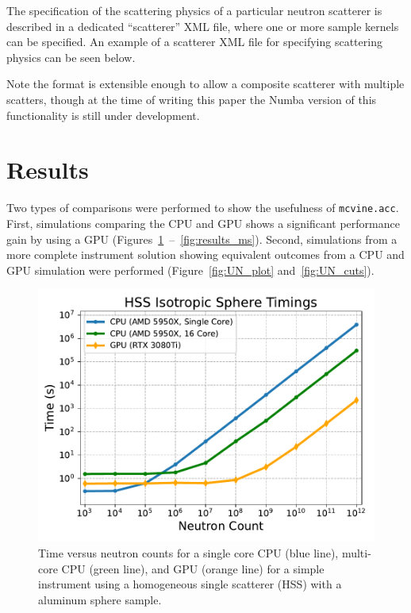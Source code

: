 The specification of the scattering physics of a particular neutron scatterer is described in a dedicated ``scatterer'' XML file, where one or more sample kernels can be specified.
An example of a scatterer XML file for specifying scattering physics can be seen below.

\vspace{1mm}

\vspace{1mm}

Note the format is extensible enough to allow a composite scatterer with multiple scatters, though at the time of writing this paper the Numba version of this functionality is still under development.


\section{Results}

Two types of comparisons were performed to show the usefulness of \texttt{mcvine.acc}. First, simulations comparing the CPU and GPU shows a significant performance gain by using a GPU (Figures~\hbox{\ref{fig:results_isotropic_sphere} -- \ref{fig:results_ms}}).
Second, simulations from a more complete instrument solution showing equivalent outcomes from a CPU and GPU simulation were performed (Figure~\ref{fig:UN_plot} and~\ref{fig:UN_cuts}). 

\begin{figure}[h]
    \centering
    \includegraphics[width=\columnwidth]{figures/mcvine_hss_isotropic_timings.pdf}
    \caption{Time versus neutron counts for  a single core CPU (blue line), multi-core CPU (green line), and GPU (orange line) for a simple instrument using a homogeneous single scatterer (HSS) with a aluminum sphere sample.}
    \label{fig:results_isotropic_sphere}
\end{figure}

